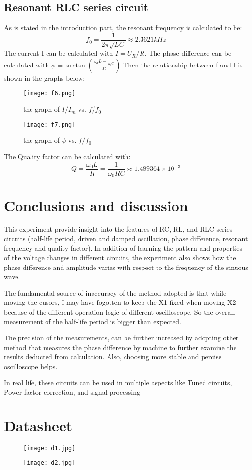 \documentclass[12pt, a4paper, oneside]{article}
\begin{document}
\subsection{Resonant RLC series circuit}
\label{sec_results}

As is stated in the introduction part, the resonant frequency is calculated to be:
\[f_0 = \frac{1}{2\pi\sqrt{LC}} \approx 2.3621 kHz\]
The current I can be calculated with $I=U_R/R$.
The phase difference can be calculated with $\phi = \arctan{(\frac{\omega_d L-\frac{1}{\omega_d C}}{R})}$
Then the relationship between f and I is shown in the graphs below:

\begin{figure}[htbp!]
  \centering
  \texttt{[image: f6.png]}
  \caption{the graph of $I/I_m$ vs. $f/f_0$ } 
\end{figure}

\begin{figure}[htbp!]
  \centering
  \texttt{[image: f7.png]}
  \caption{the graph of $\phi$ vs. $f/f_0$} 
\end{figure}

The Quality factor can be calculated with:
\[Q=\frac{\omega_0L}{R}=\frac{1}{\omega_0RC}\approx1.489364\times10^{-3}\]

\section{Conclusions and discussion}
This experiment provide insight into the features of RC, RL, and RLC series circuits (half-life period, driven and damped oscillation, phase difference, resonant frequency and quality factor). In addition of learning the pattern and properties of the voltage changes in different circuits, the experiment also shows how the phase difference and amplitude varies with respect to the frequency of the sinuous wave.

The fundamental source of inaccuracy of the method adopted is that while moving the cusors, I may have fogotten to keep the X1 fixed when moving X2 because of the different operation logic of different oscilloscope. So the overall measurement of the half-life period is bigger than expected.

The precision of the measurements, can be further increased by adopting other method that measures the phase difference by machine to further examine the results deducted from calculation. Also, choosing more stable and percise oscilloscope helps.

In real life, these circuits can be used in multiple aspects like Tuned circuits, Power factor correction, and signal processing



\pagebreak
\appendix
\section{Datasheet}
\begin{figure}[htbp!]
  \centering
  \texttt{[image: d1.jpg]}
  \caption{}
\end{figure}
\begin{figure}[htbp!]
  \centering
  \texttt{[image: d2.jpg]}
  \caption{}
\end{figure}
\end{document}

